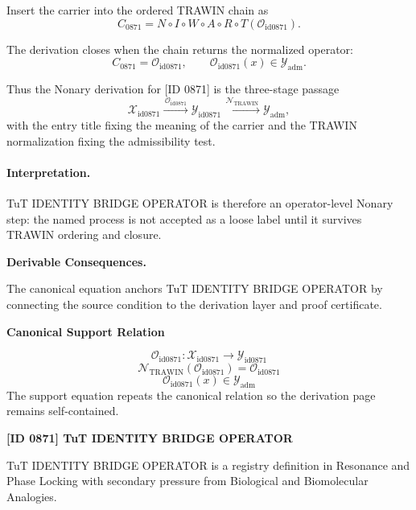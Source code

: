 Insert the carrier into the ordered TRAWIN chain as\[
C_{0871}=N\circ I\circ W\circ A\circ R\circ T(\mathcal{O}_{\mathrm{id0871}}).
\]

The derivation closes when the chain returns the normalized operator:\[
C_{0871}=\mathcal{O}_{\mathrm{id0871}},\qquad \mathcal{O}_{\mathrm{id0871}}(x)\in\mathcal{Y}_{\mathrm{adm}}.
\]

Thus the Nonary derivation for [ID 0871] is the three-stage passage
\[
\mathcal{X}_{\mathrm{id0871}}\xrightarrow{\,\mathcal{O}_{\mathrm{id0871}}\,} \mathcal{Y}_{\mathrm{id0871}}\xrightarrow{\,\mathcal{N}_{\mathrm{TRAWIN}}\,} \mathcal{Y}_{\mathrm{adm}},
\]
with the entry title fixing the meaning of the carrier and the TRAWIN normalization fixing the admissibility test.

\paragraph{Interpretation.} TuT IDENTITY BRIDGE OPERATOR is therefore an operator-level Nonary step: the named process is not accepted as a loose label until it survives TRAWIN ordering and closure.

\par\vspace{0.35em}
\noindent\textbf{Derivable Consequences.}\quad
\begingroup
\footnotesize
\raggedright
The canonical equation anchors TuT IDENTITY BRIDGE OPERATOR by connecting the source condition to the derivation layer and proof certificate.
\par\endgroup

\noindent\textbf{Canonical Support Relation}\par
\[
\mathcal{O}_{\mathrm{id0871}}:\mathcal{X}_{\mathrm{id0871}}\longrightarrow\mathcal{Y}_{\mathrm{id0871}}
\]
\[
\mathcal{N}_{\mathrm{TRAWIN}}(\mathcal{O}_{\mathrm{id0871}})=\mathcal{O}_{\mathrm{id0871}}
\]
\[
\mathcal{O}_{\mathrm{id0871}}(x)\in\mathcal{Y}_{\mathrm{adm}}
\]
\noindent The support equation repeats the canonical relation so the derivation page remains self-contained.\par

\clearpage
\noindent\textbf{[ID 0871] TuT IDENTITY BRIDGE OPERATOR}\par
\vspace{0.35em}
\begingroup\small
{}
TuT IDENTITY BRIDGE OPERATOR is a registry definition in Resonance and Phase Locking with secondary pressure from Biological and Biomolecular Analogies.

